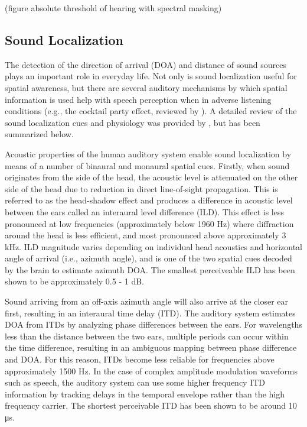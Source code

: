 (figure absolute threshold of hearing with spectral masking)


\subsection{Sound Localization}

The detection of the direction of arrival (DOA) and distance of sound sources plays an important role in everyday life. Not only is sound localization useful for spatial awareness, but there are several auditory mechanisms by which spatial information is used help with speech perception when in adverse listening conditions (e.g., the cocktail party effect, reviewed by \cite{bronkhorst2000cocktail}). A detailed review of the sound localization cues and physiology was provided by  \cite{risoud2018localization}, but has been summarized below.

Acoustic properties of the human auditory system enable sound localization by means of a number of binaural and monaural spatial cues. Firstly, when sound originates from the side of the head, the acoustic level is attenuated on the other side of the head due to reduction in direct line-of-sight propagation. This is referred to as the head-shadow effect and produces a difference in acoustic level between the ears called an interaural level difference (ILD). This effect is less pronounced at low frequencies (approximately below 1960 Hz) where diffraction around the head is less efficient, and most pronounced above approximately 3 kHz. ILD magnitude varies depending on individual head acoustics and horizontal angle of arrival (i.e., azimuth angle), and is one of the two spatial cues decoded by the brain to estimate azimuth DOA. The smallest perceiveable ILD has been shown to be approximately 0.5 - 1 dB.

Sound arriving from an off-axis azimuth angle will also arrive at the closer ear first, resulting in an interaural time delay (ITD). The auditory system estimates DOA from ITDs by analyzing phase differences between the ears. For wavelengths less than the distance between the two ears, multiple periods can occur within the time difference, resulting in an ambiguous mapping between phase difference and DOA. For this reason, ITDs become less reliable for frequencies above approximately 1500 Hz. In the case of complex amplitude modulation waveforms such as speech, the auditory system can use some higher frequency ITD information by tracking delays in the temporal envelope rather than the high frequency carrier. The shortest perceivable ITD has been shown to be around 10 \unit{\micro\second}.

